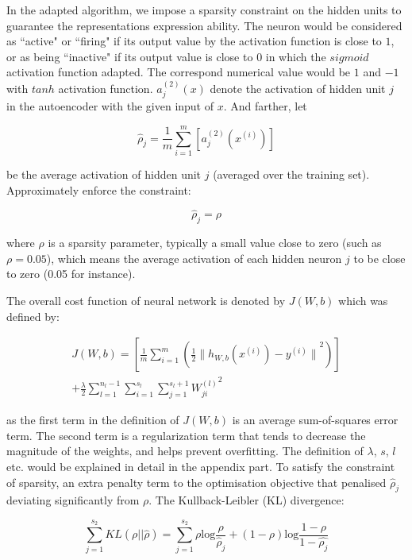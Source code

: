 \documentclass[journal]{IEEEtran}
\begin{document}
In the adapted algorithm, we impose a sparsity constraint on the hidden units to guarantee the representations expression ability.
The neuron would be considered as ``active" or ``firing" if its output value by the activation function is close to $1$, or as being ``inactive" if its output value is close to $0$ in which the $sigmoid$ activation function adapted. The correspond numerical value would be $1$ and $-1$ with $tanh$ activation function. $a_j^{(2)}(x)$ denote the activation of hidden unit $j$ in the autoencoder with the given input of $x$. 
And farther, let 

\begin{equation}
\hat{\rho}_j = \frac{1}{m} \sum_{i=1}^m [{a_j^{(2)}}{(x^{(i)})}]
\end{equation}

\noindent be the average activation of hidden unit $j$ (averaged over the training set). Approximately enforce the constraint:

\begin{equation}
\hat{\rho}_j = \rho
\end{equation}

where $\rho$ is a sparsity parameter, typically a small value close to zero (such as $\rho = 0.05$), which means the average activation of each hidden neuron $j$ to be close to zero (0.05 for instance). 

The overall cost function of neural network is denoted by $J(W,b)$ which was defined by:

\begin{equation}
\begin{split}
J(W,b) = [\frac{1}{m}\sum_{i=1}^m(\frac{1}{2}{\|{h_{W,b}(x^{(i)})} - y^{(i)}\|}^2)] \\
+ \frac{\lambda}{2}\sum_{l=1}^{n_l-1} \sum_{i=1}^{s_l} \sum_{j=1}^{s_l+1}{W_{ji}^{(l)}}^2
\end{split}
\end{equation}

\noindent as the first term in the definition of $J(W,b)$ is an average sum-of-squares error term. The second term is a regularization term that tends to decrease the magnitude of the weights, and helps prevent overfitting. The definition of $\lambda$, $s$, $l$ etc. would be explained in detail in the appendix part. To satisfy the constraint of sparsity, an extra penalty term to the optimisation objective that penalised $\hat{\rho}_j $ deviating significantly from $\rho$. The Kullback-Leibler (KL) divergence:

\begin{equation}
 \sum_{j=1}^{s_2}KL(\rho||\hat{\rho}) =  \sum_{j=1}^{s_2}\rho \text{log}{\frac{\rho}{\hat{\rho}_j}}+(1-\rho)\text{log}\frac{1-\rho}{1-\hat{{\rho}_j}}
\end{equation}
\end{document}
